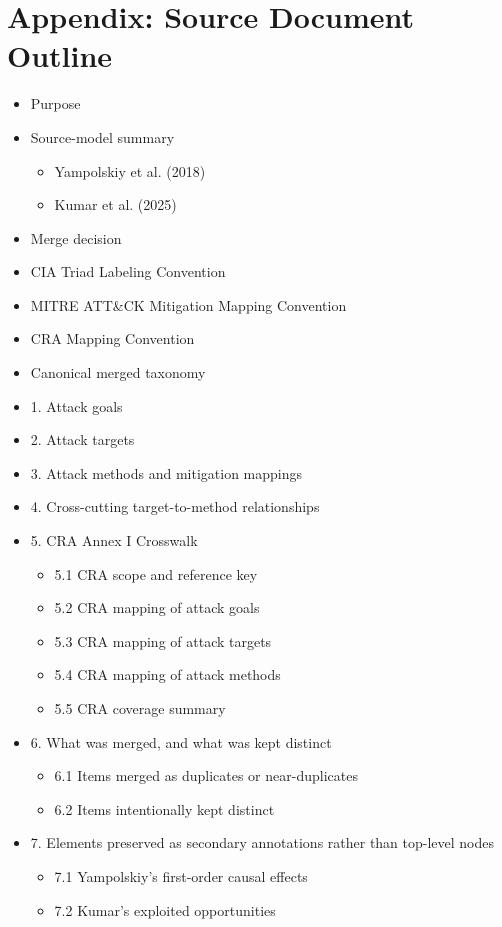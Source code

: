 \documentclass[10pt,a4paper,oneside]{report}
\begin{document}
\appendix
\chapter{Appendix: Source Document Outline}


\begin{itemize}
\item Purpose
\item Source-model summary
\begin{itemize}
\item Yampolskiy et al. (2018)
\item Kumar et al. (2025)
\end{itemize}
\item Merge decision
\item CIA Triad Labeling Convention
\item MITRE ATT\&CK Mitigation Mapping Convention
\item CRA Mapping Convention
\item Canonical merged taxonomy
\item 1. Attack goals
\item 2. Attack targets
\item 3. Attack methods and mitigation mappings
\item 4. Cross-cutting target-to-method relationships
\item 5. CRA Annex I Crosswalk
\begin{itemize}
\item 5.1 CRA scope and reference key
\item 5.2 CRA mapping of attack goals
\item 5.3 CRA mapping of attack targets
\item 5.4 CRA mapping of attack methods
\item 5.5 CRA coverage summary
\end{itemize}
\item 6. What was merged, and what was kept distinct
\begin{itemize}
\item 6.1 Items merged as duplicates or near-duplicates
\item 6.2 Items intentionally kept distinct
\end{itemize}
\item 7. Elements preserved as secondary annotations rather than top-level nodes
\begin{itemize}
\item 7.1 Yampolskiy's first-order causal effects
\item 7.2 Kumar's exploited opportunities

\end{itemize}
\end{itemize}
\end{document}

